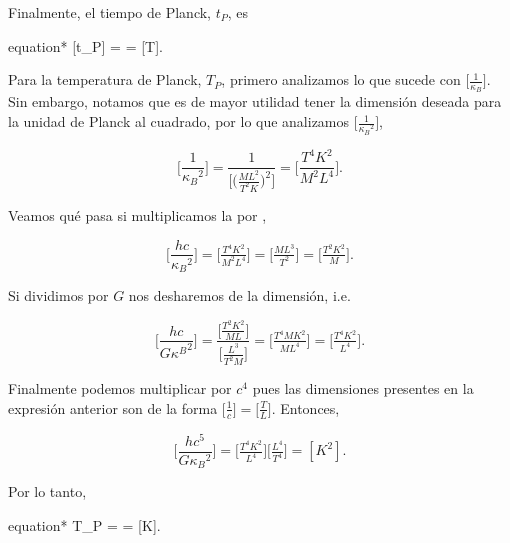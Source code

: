 \documentclass[../main.tex]{subfiles}
\begin{document}
\begin{problema}[10]
	Finalmente, el tiempo de Planck, \(t_{P}\), es

	\begin{empheq}[box=\mainresult]{equation*}
		[t_{P}] =  = [T].
	\end{empheq}

	Para la temperatura de Planck, \(T_{P}\), primero analizamos lo que sucede con
	\(\bigl[\tfrac{1}{\kappa_{B}}\bigr]\). Sin embargo, notamos que es de mayor
	utilidad tener la dimensión deseada para la unidad de Planck al cuadrado, por
	lo que analizamos \(\bigl[\tfrac{1}{{\kappa_{B}}^{2}}\bigr]\),

	\begin{equation}
		\biggl[\dfrac{1}{{\kappa_{B}}^{2}}\biggr] =
		\dfrac{1}{\Biggl[\biggl(\tfrac{ML^{2}}{T^{2}K}\biggr)^{2}\Biggr]} =
		\Biggl[\dfrac{T^{4}K^{2}}{M^{2}L^{4}}\Biggr].
		\label{eq:OneOverKb2}
	\end{equation}

	Veamos qué pasa si multiplicamos la  por
	,

	\begin{equation*}
		\Biggl[\dfrac{hc}{{\kappa_{B}}^{2}}\Biggr] =
		\biggl[\tfrac{T^{4}K^{2}}{M^{2}L^{4}}\biggr] =
		\biggl[\tfrac{ML^{3}}{T^{2}}\biggr] =
		\biggl[\tfrac{T^{2}K^{2}}{M}\biggr].
	\end{equation*}

	Si dividimos por \(G\) nos desharemos de la dimensión, i.e.

	\begin{equation*}
		\Biggl[\dfrac{hc}{G{\kappa^{B}}^{2}}\Biggr] =
		\dfrac{\biggl[\tfrac{T^{2}K^{2}}{ML}\biggr]}{\biggl[\tfrac{L^{3}}{T^{2}M}\biggr]} =
		\biggl[\tfrac{T^{4}MK^{2}}{ML^{4}}\biggr] =
		\biggl[\tfrac{T^{4}K^{2}}{L^{4}}\biggr].
	\end{equation*}

	Finalmente podemos multiplicar por \(c^{4}\) pues las dimensiones presentes
	en la expresión anterior son de la forma \(\bigl[\tfrac{1}{c}\bigr] = \bigl[\tfrac{T}{L}\bigr]\). Entonces,

	\begin{equation*}
		\Biggl[\dfrac{hc^{5}}{G{\kappa_{B}}^{2}}\Biggr] =
		\biggl[\tfrac{T^{4}K^{2}}{L^{4}}\biggr]\biggl[\tfrac{L^{4}}{T^{4}}\biggr] =
		[K^{2}].
	\end{equation*}

	Por lo tanto,

	\begin{empheq}[box=\mainresult]{equation*}
		T_{P} =  = [K].
	\end{empheq}
\end{problema}
\end{document}

